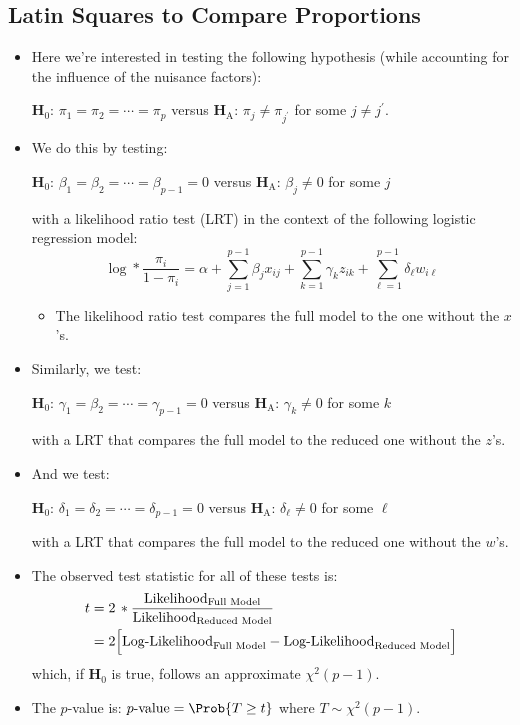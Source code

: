 \subsection{Latin Squares to Compare Proportions}
\begin{itemize}
      \item Here we're interested in testing the following hypothesis (while accounting for the influence of the
            nuisance factors):
            \begin{tightcenter}
                  $ \mathbf{H}_0 $: $ \pi_1=\pi_2=\cdots=\pi_p $ versus $ \mathbf{H}_\text{A} $: $ \pi_j\ne \pi_{j^\prime }$ for some $ j\ne j^\prime $.
            \end{tightcenter}
      \item We do this by testing:
            \begin{tightcenter}
                  $ \mathbf{H}_0 $: $ \beta_1=\beta_2=\cdots=\beta_{p-1}=0 $ versus $ \mathbf{H}_\text{A} $: $ \beta_j\ne 0$ for some $ j $
            \end{tightcenter}
            with a likelihood ratio test (LRT) in the context of the following logistic regression model:
            \[ \log*{\frac{\pi_i}{1-\pi_i}}=\alpha+\sum_{j=1}^{p-1} \beta_j x_{ij}+\sum_{k=1}^{p-1} \gamma_k z_{ik}+\sum_{\ell=1}^{p-1} \delta_\ell w_{i\ell} \]
            \begin{itemize}
                  \item The likelihood ratio test compares the full model to the one without the $ x $'s.
            \end{itemize}
      \item Similarly, we test:
            \begin{tightcenter}
                  $ \mathbf{H}_0 $: $ \gamma_1=\beta_2=\cdots=\gamma_{p-1}=0 $ versus $ \mathbf{H}_\text{A} $: $ \gamma_k\ne 0$ for some $ k $
            \end{tightcenter}
            with a LRT that compares the full model to the reduced one without the $ z $'s.
      \item And we test:
            \begin{tightcenter}
                  $ \mathbf{H}_0 $: $ \delta_1=\delta_2=\cdots=\delta_{p-1}=0 $ versus $ \mathbf{H}_\text{A} $: $ \delta_\ell\ne 0$ for some $ \ell $
            \end{tightcenter}
            with a LRT that compares the full model to the reduced one without the $ w $'s.
      \item The observed test statistic for all of these tests is:
            \begin{align*}
                  t & =2\,\log*{\frac{\text{Likelihood}_{\text{Full Model}}}{\text{Likelihood}_{\text{Reduced Model}}}}    \\
                    & =2\Bigl[\text{Log-Likelihood}_{\text{Full Model}}-\text{Log-Likelihood}_{\text{Reduced Model}}\Bigr]
            \end{align*}
            which, if $ \mathbf{H}_0 $ is true, follows an approximate $ \chi^2(p-1) $.
      \item The $ p $-value is: $ p\text{-value}=\Prob{T\ge t} $ where $ T \sim \chi^2(p-1) $.
\end{itemize}
